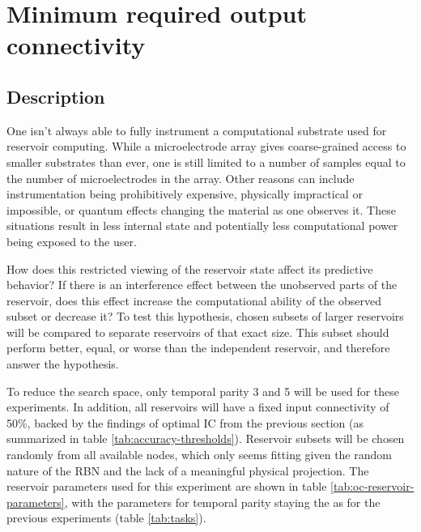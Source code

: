 \section{Minimum required output connectivity}

\subsection{Description}

One isn't always able to fully instrument a computational substrate used for reservoir computing.
While a microelectrode array gives coarse-grained access to smaller substrates than ever,
one is still limited to a number of samples equal to the number of microelectrodes in the array.
Other reasons can include instrumentation being prohibitively expensive,
physically impractical or impossible,
or quantum effects changing the material as one observes it.
These situations result in less internal state and potentially less computational power being exposed to the user.

How does this restricted viewing of the reservoir state affect its predictive behavior?
If there is an interference effect between the unobserved parts of the reservoir,
does this effect increase the computational ability of the observed subset or decrease it?
To test this hypothesis,
chosen subsets of larger reservoirs will be compared to separate reservoirs of that exact size.
This subset should perform better, equal, or worse than the independent reservoir, and therefore answer the hypothesis.

To reduce the search space, only temporal parity 3 and 5 will be used for these experiments.
In addition, all reservoirs will have a fixed input connectivity of 50\%,
backed by the findings of optimal IC from the previous section (as summarized in table \ref{tab:accuracy-thresholds}).
Reservoir subsets will be chosen randomly from all available nodes,
which only seems fitting given the random nature of the RBN and the lack of a meaningful physical projection.
The reservoir parameters used for this experiment are shown in table \ref{tab:oc-reservoir-parameters},
with the parameters for temporal parity staying the as for the previous experiments (table \ref{tab:tasks}).


